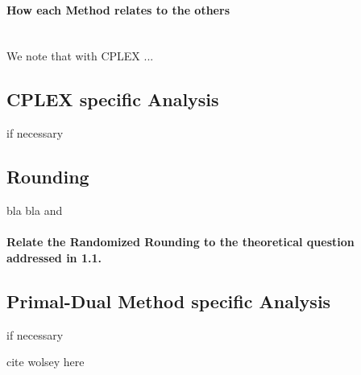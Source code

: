 \documentclass[11pt,a4paper,english]{article}
\begin{document}
\paragraph{How each Method relates to the others}\mbox{}\\
We note that with CPLEX ...



\subsection{CPLEX specific Analysis}
if necessary
\subsection{Rounding}
bla bla and
\paragraph{Relate the Randomized Rounding to the theoretical question addressed in 1.1.}

\subsection{Primal-Dual Method specific Analysis}
if necessary



cite wolsey here


\clearpage


\end{document}
